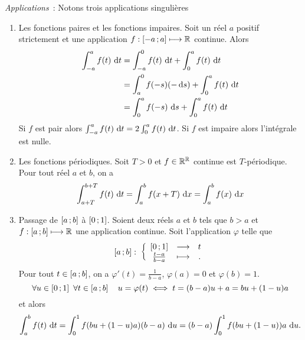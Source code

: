 \emph{Applications}~: Notons trois applications singulières
\begin{enumerate}
  \item Les fonctions paires et les fonctions impaires. Soit un réel \(a\) 
    positif strictement et une application \(f : \left[ -a \, ; {} a \right] 
    \longmapsto \mathbb{R}\) continue. Alors
    \begin{align*}
      \int_{-a}^a f(t)\,\mathop{}\mathopen{}\mathrm{d} t & = \int_{-a}^0 f(t)\,\mathop{}\mathopen{}\mathrm{d} t + \int_{0}^a 
      f(t)\,\mathop{}\mathopen{}\mathrm{d} t \\
      & = \int_a^0 f(-s)(-\mathop{}\mathopen{}\mathrm{d} s) + \int_{0}^a f(t)\,\mathop{}\mathopen{}\mathrm{d} t \\
      & = \int_0^a f(-s)\,\mathop{}\mathopen{}\mathrm{d} s + \int_{0}^a f(t)\,\mathop{}\mathopen{}\mathrm{d} t \\
    \end{align*}
    Si \(f\) est pair alors \(\int_{-a}^a f(t)\,\mathop{}\mathopen{}\mathrm{d} t = 2 \int_{0}^a 
    f(t)\,\mathop{}\mathopen{}\mathrm{d} t\). Si \(f\) est impaire alors l'intégrale est nulle.

  \item Les fonctions périodiques. Soit \(T >0\) et \(f \in \mathbb{R}^{\mathbb{R}}\) continue 
    est \(T\)-périodique. Pour tout réel \(a\) et \(b\), on a
    \begin{equation}
      \int_{a+T}^{b+T} f(t)\,\mathop{}\mathopen{}\mathrm{d} t = \int_a^bf(x+T)\,\mathop{}\mathopen{}\mathrm{d} x = 
      \int_a^bf(x)\,\mathop{}\mathopen{}\mathrm{d} x
    \end{equation}
  \item Passage de \(\left[ a \, ; {} b \right]\) à \(\left[ 0 \, ; {} 1 \right]\). Soient 
    deux réels \(a\) et \(b\) tels que \(b>a\) et \(f:\left[ a \, ; {} b \right] 
    \longmapsto \mathbb{R}\) une application continue. Soit l'application \(\varphi\) 
    telle que
    \begin{equation}
      \left[ a \, ; {} b \right]\colon\left\{\begin{array}{ccc}\left[ 0 \, ; {} 1 \right] & \longrightarrow &t\\\frac{t-a}{b-a} & \longmapsto & .\end{array}\right.
    \end{equation}
    Pour tout \(t \in \left[ a \, ; {} b \right]\), on a \(\varphi'(t) = 
    \frac{1}{b-a}\), \(\varphi(a) = 0\) et \(\varphi(b) = 1\).
    \begin{equation}
      \forall u \in \left[ 0 \, ; {} 1 \right] \ \forall t \in \left[ a \, ; {} b \right] 
      \quad u = \varphi(t) \iff t = (b-a)u +a = bu +(1-u)a
    \end{equation}
    et alors
    \begin{equation}
      \int_a^b f(t)\,\mathop{}\mathopen{}\mathrm{d} t = \int_0^1 f(bu+(1-u)a)(b-a)\,\mathop{}\mathopen{}\mathrm{d} u = (b-a) 
      \int_0^1 f(bu+(1-u))a\,\mathop{}\mathopen{}\mathrm{d} u.
    \end{equation}
\end{enumerate}

